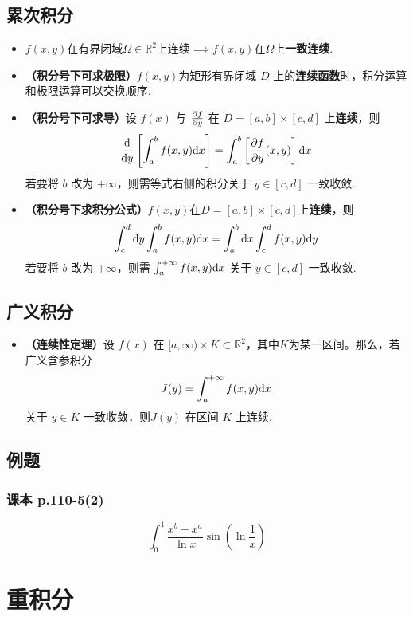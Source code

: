 \documentclass[./main.tex]{subfiles}
\begin{document}
\subsection{累次积分}
\begin{itemize}
  \item $f(x,y)$在有界闭域$\Omega\in \mathbb{R}^2$上连续$\implies f(x,y)$在$\Omega$上\textbf{一致连续}.
  \item \textbf{（积分号下可求极限）}$f(x,y)$为矩形有界闭域 $D$ 上的\textbf{连续函数}时，积分运算和极限运算可以交换顺序.
  \item \textbf{（积分号下可求导）}设 $f(x)$ 与 $\frac{\partial f}{\partial y}$ 在 $D=[a,b]\times[c,d]$ 上\textbf{连续}，则
  $$\frac{\text{d}}{\text{d}y}\left[\int_a^bf(x,y)\text{d}x\right]=\int_a^b\left[\frac{\partial f}{\partial y}(x,y)\right]\text{d}x$$
  若要将 $b$ 改为 $+\infty$，则需等式右侧的积分关于 $y\in[c,d]$ 一致收敛.
  \item \textbf{（积分号下求积分公式）}$f(x,y)$在$D=[a,b]\times[c,d]$上\textbf{连续}，则
  $$\int_c^d\text{d}y\int_a^bf(x,y)\text{d}x=\int_a^b\text{d}x\int_c^df(x,y)\text{d}y$$
  若要将 $b$ 改为 $+\infty$，则需 $\int_a^{+\infty}f(x,y)\text{d}x$ 关于 $y\in[c,d]$ 一致收敛.
\end{itemize}
\subsection{广义积分}
\begin{itemize}
  \item \textbf{（连续性定理）}设 $f(x)$ 在 $[a,\infty)\times K\subset \mathbb{R}^2$，其中$K$为某一区间。那么，若广义含参积分 $$J(y)=\int_a^{+\infty}f(x,y)\text{d}x$$ 关于 $y\in K$ 一致收敛，则$J(y)$ 在区间 $K$ 上连续.
\end{itemize}
\subsection{例题}
\subsubsection{课本 p.110-5(2)}
\vspace{-1em}
$$\int_0^1\frac{x^b-x^a}{\ln x}\sin\left(\ln\frac{1}{x}\right)$$
\section{重积分}
\end{document}
